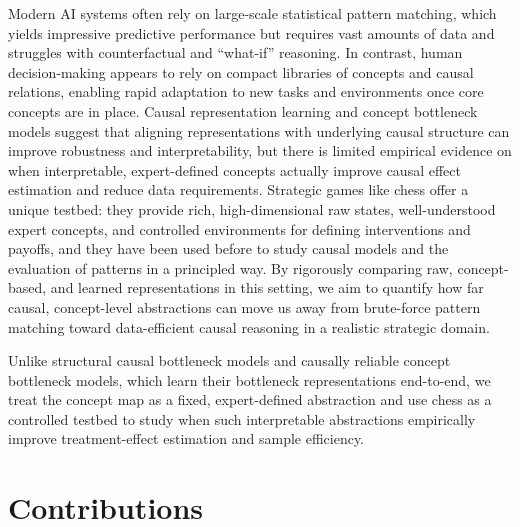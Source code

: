 \documentclass[11pt]{article}
\begin{document}
Modern AI systems often rely on large-scale statistical pattern matching, which yields impressive predictive performance but requires vast amounts of data and struggles with counterfactual and ``what-if'' reasoning.\cite{lake2017building,reasoningAIMag} In contrast, human decision-making appears to rely on compact libraries of concepts and causal relations, enabling rapid adaptation to new tasks and environments once core concepts are in place.\cite{lake2017building,towardHumanLevelConcept} Causal representation learning and concept bottleneck models suggest that aligning representations with underlying causal structure can improve robustness and interpretability, but there is limited empirical evidence on when interpretable, expert-defined concepts actually improve causal effect estimation and reduce data requirements.\cite{scholkopf2021towards,koh2020concept,fromCausalToConcept} Strategic games like chess offer a unique testbed: they provide rich, high-dimensional raw states, well-understood expert concepts, and controlled environments for defining interventions and payoffs, and they have been used before to study causal models and the evaluation of patterns in a principled way.\cite{lemeire2005causalmodelsinchess,fortressesPaper,causalMaskingSpatial} By rigorously comparing raw, concept-based, and learned representations in this setting, we aim to quantify how far causal, concept-level abstractions can move us away from brute-force pattern matching toward data-efficient causal reasoning in a realistic strategic domain.\cite{scholkopf2021towards,causalReasoningRL,fromCausalToConcept}

Unlike structural causal bottleneck models and causally reliable concept bottleneck models, which learn their bottleneck representations end-to-end, we treat the concept map as a fixed, expert-defined abstraction and use chess as a controlled testbed to study when such interpretable abstractions empirically improve treatment-effect estimation and sample efficiency.\cite{fromCausalToConcept,scholkopf2021towards}

\section*{Contributions}
\end{document}
